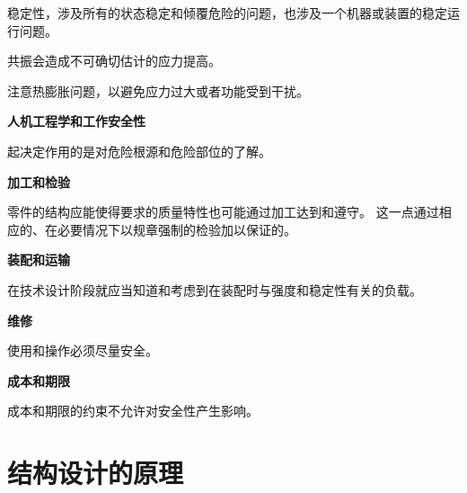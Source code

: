 \documentclass[letterpaper,10pt,english]{sphinxmanual}
\begin{document}
稳定性，涉及所有的状态稳定和倾覆危险的问题，也涉及一个机器或装置的稳定运行问题。

共振会造成不可确切估计的应力提高。

注意热膨胀问题，以避免应力过大或者功能受到干扰。

\textbf{人机工程学和工作安全性}

起决定作用的是对危险根源和危险部位的了解。

\textbf{加工和检验}

零件的结构应能使得要求的质量特性也可能通过加工达到和遵守。
这一点通过相应的、在必要情况下以规章强制的检验加以保证的。

\textbf{装配和运输}

在技术设计阶段就应当知道和考虑到在装配时与强度和稳定性有关的负载。

\textbf{维修}

使用和操作必须尽量安全。

\textbf{成本和期限}

成本和期限的约束不允许对安全性产生影响。


\section{结构设计的原理}
\label{unit6:id8}
\end{document}
